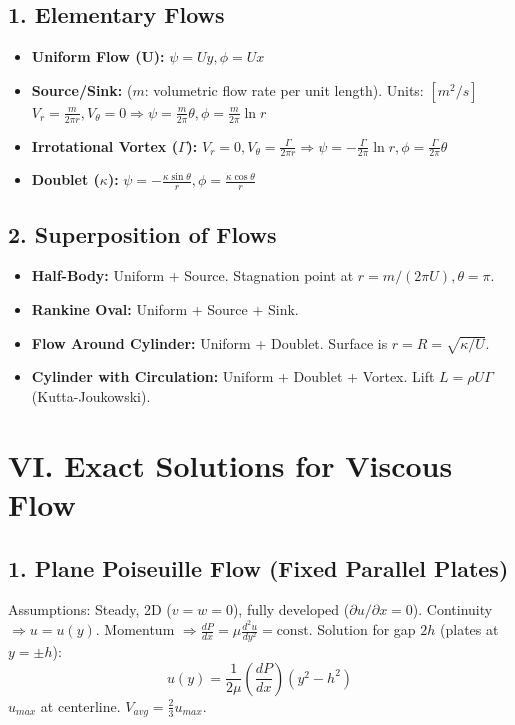 \documentclass[9pt, a4paper, twocolumn]{article}
\begin{document}
\subsection{1. Elementary Flows}
\begin{itemize}
    \item \textbf{Uniform Flow (U):} $\psi = Uy, \phi = Ux$
    \item \textbf{Source/Sink:} ($m$: volumetric flow rate per unit length). Units: $[m^2/s]$ $V_r = \frac{m}{2\pi r}, V_\theta = 0 \Rightarrow \psi = \frac{m}{2\pi}\theta, \phi = \frac{m}{2\pi}\ln r$
    \item \textbf{Irrotational Vortex ($\Gamma$):} $V_r = 0, V_\theta = \frac{\Gamma}{2\pi r} \Rightarrow \psi = -\frac{\Gamma}{2\pi}\ln r, \phi = \frac{\Gamma}{2\pi}\theta$
    \item \textbf{Doublet ($\kappa$):} $\psi = -\frac{\kappa \sin \theta}{r}, \phi = \frac{\kappa \cos \theta}{r}$
\end{itemize}

\subsection{2. Superposition of Flows}
\begin{itemize}
    \item \textbf{Half-Body:} Uniform + Source. Stagnation point at $r=m/(2\pi U), \theta = \pi$.
    \item \textbf{Rankine Oval:} Uniform + Source + Sink.
    \item \textbf{Flow Around Cylinder:} Uniform + Doublet. Surface is $r = R = \sqrt{\kappa/U}$.
    \item \textbf{Cylinder with Circulation:} Uniform + Doublet + Vortex. 
    Lift $L = \rho U \Gamma$ (Kutta-Joukowski).
\end{itemize}

\section{VI. Exact Solutions for Viscous Flow}
\subsection{1. Plane Poiseuille Flow (Fixed Parallel Plates)}
Assumptions: Steady, 2D ($v=w=0$), fully developed ($\partial u / \partial x = 0$).
Continuity $\Rightarrow u = u(y)$. Momentum $\Rightarrow \frac{dP}{dx} = \mu \frac{d^2 u}{dy^2} = \text{const}$.
Solution for gap $2h$ (plates at $y = \pm h$):
\begin{equation*}
    u(y) = \frac{1}{2\mu} \left(\frac{dP}{dx}\right) (y^2 - h^2)
\end{equation*}
$u_{max}$ at centerline. $V_{avg} = \frac{2}{3}u_{max}$.
\end{document}
